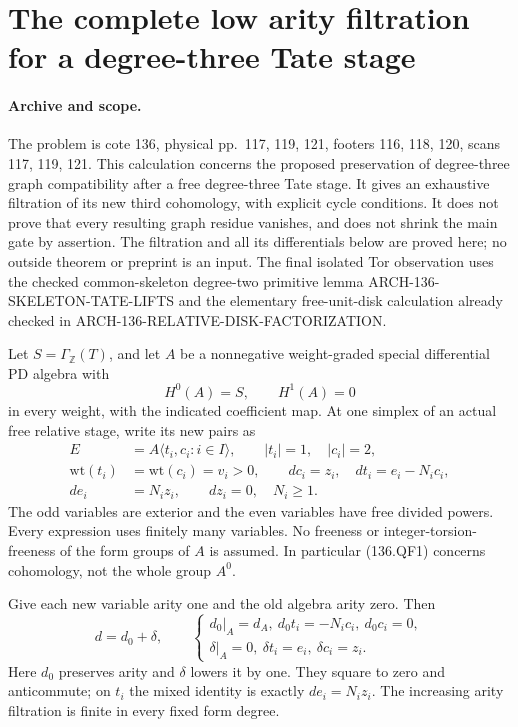 \section{The complete low arity filtration for a degree-three Tate stage}
\label{sec:136-q3-low-filtration}

\paragraph{Archive and scope.}
The problem is cote 136, physical pp.~117, 119, 121,
footers 116, 118, 120, scans 117, 119, 121.  This calculation concerns
the proposed preservation of degree-three graph compatibility
after a free degree-three Tate stage.  It gives an exhaustive
filtration of its new third cohomology, with explicit cycle
conditions.  It does not prove that every resulting graph residue
vanishes, and does not shrink the main gate by assertion.
The filtration and all its differentials below are proved here;
no outside theorem or preprint is an input.  The final isolated
Tor observation uses the checked common-skeleton degree-two
primitive lemma ARCH-136-SKELETON-TATE-LIFTS and the elementary
free-unit-disk calculation already checked in
ARCH-136-RELATIVE-DISK-FACTORIZATION.

Let \(S=\Gamma_{\mathbb Z}(T)\), and let \(A\) be a
nonnegative weight-graded special differential PD algebra with
\[
                         H^0(A)=S,\qquad H^1(A)=0
                                                               \tag{136.QF1}
\]
in every weight, with the indicated coefficient map.  At one
simplex of an actual free relative stage, write its new pairs as
\[
 \begin{aligned}
 E&=A\langle t_i,c_i:i\in I\rangle,
       \qquad |t_i|=1,\quad |c_i|=2,\\
 \mathrm{wt}(t_i)&=\mathrm{wt}(c_i)=v_i>0,
       \qquad dc_i=z_i,\quad dt_i=e_i-N_i c_i,\\
 de_i&=N_i z_i,\qquad dz_i=0,\quad N_i\geq1.
 \end{aligned}
                                                               \tag{136.QF2}
\]
The odd variables are exterior and the even variables have free
divided powers.  Every expression uses finitely many variables.
No freeness or integer-torsion-freeness of the form groups of
\(A\) is assumed.  In particular (136.QF1) concerns cohomology,
not the whole group \(A^0\).

Give each new variable arity one and the old algebra arity zero.
Then
\[
               d=d_0+\delta,\qquad
 \begin{cases}
 d_0|_A=d_A,\ d_0t_i=-N_i c_i,\ d_0c_i=0,\\
 \delta|_A=0,\ \delta t_i=e_i,\ \delta c_i=z_i.
 \end{cases}                                                \tag{136.QF3}
\]
Here \(d_0\) preserves arity and \(\delta\) lowers it by
one.  They square to zero and anticommute; on \(t_i\) the
mixed identity is exactly \(de_i=N_i z_i\).  The increasing
arity filtration is finite in every fixed form degree.


